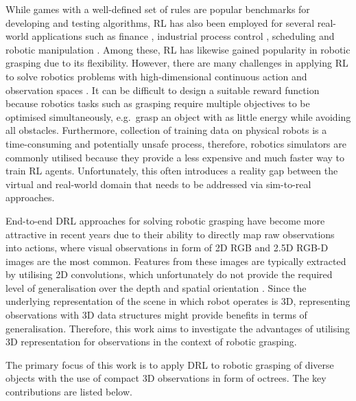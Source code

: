 While games with a well-defined set of rules are popular benchmarks for developing and testing algorithms, RL has also been employed for several real-world applications such as finance \cite{fischer_reinforcement_2018}, industrial process control \cite{nian_review_2020}, scheduling \cite{shyalika_reinforcement_2020} and robotic manipulation \cite{kroemer_review_2021}. Among these, RL has likewise gained popularity in robotic grasping due to its flexibility. However, there are many challenges in applying RL to solve robotics problems with high-dimensional continuous action and observation spaces \cite{kroemer_review_2021}. It can be difficult to design a suitable reward function because robotics tasks such as grasping require multiple objectives to be optimised simultaneously, e.g.~grasp an object with as little energy while avoiding all obstacles. Furthermore, collection of training data on physical robots is a time-consuming and potentially unsafe process, therefore, robotics simulators are commonly utilised because they provide a less expensive and much faster way to train RL agents. Unfortunately, this often introduces a reality gap between the virtual and real-world domain that needs to be addressed via sim-to-real approaches.

End-to-end DRL approaches for solving robotic grasping have become more attractive in recent years due to their ability to directly map raw observations into actions, where visual observations in form of 2D RGB and 2.5D RGB-D images are the most common. Features from these images are typically extracted by utilising 2D convolutions, which unfortunately do not provide the required level of generalisation over the depth and spatial orientation \cite{gualtieri_pick_2018}. Since the underlying representation of the scene in which robot operates is 3D, representing observations with 3D data structures might provide benefits in terms of generalisation. Therefore, this work aims to investigate the advantages of utilising 3D representation for observations in the context of robotic grasping.

The primary focus of this work is to apply DRL to robotic grasping of diverse objects with the use of compact 3D observations in form of octrees. The key contributions are listed below.

